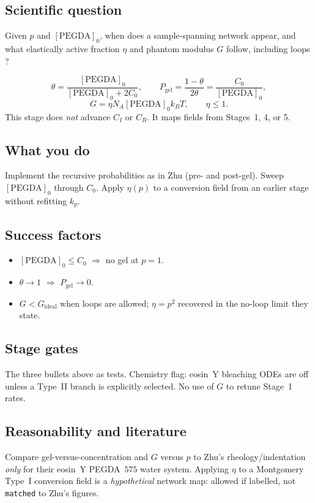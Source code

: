 \documentclass[11pt,a4paper]{article}
\newcommand{\tagmatch}{\texttt{matched}}
\begin{document}
\subsection{Scientific question}
Given $p$ and $[\mathrm{PEGDA}]_0$, when does a sample-spanning network appear, and what elastically active fraction $\eta$ and phantom modulus $G$ follow, including loops \citep{Zhu2020,Macosko1976,Miller1976}?

\begin{equation}
  \theta=\frac{[\mathrm{PEGDA}]_0}{[\mathrm{PEGDA}]_0+2C_0},\qquad
  P_{\mathrm{gel}}=\frac{1-\theta}{2\theta}=\frac{C_0}{[\mathrm{PEGDA}]_0},
\end{equation}
\begin{equation}
  G=\eta N_A [\mathrm{PEGDA}]_0 k_B T,\qquad \eta\le 1.
\end{equation}
This stage does \emph{not} advance $C_I$ or $C_R$.
It maps fields from Stages~1, 4, or 5.

\subsection{What you do}
Implement the recursive probabilities as in Zhu (pre- and post-gel).
Sweep $[\mathrm{PEGDA}]_0$ through $C_0$.
Apply $\eta(p)$ to a conversion field from an earlier stage without refitting $k_p$.

\subsection{Success factors}
\begin{itemize}
  \item $[\mathrm{PEGDA}]_0\le C_0$ $\Rightarrow$ no gel at $p=1$.
  \item $\theta\to 1$ $\Rightarrow$ $P_{\mathrm{gel}}\to 0$.
  \item $G < G_{\mathrm{ideal}}$ when loops are allowed; $\eta=p^2$ recovered in the no-loop limit they state.
\end{itemize}

\subsection{Stage gates}
The three bullets above as tests.
Chemistry flag: eosin~Y bleaching ODEs are off unless a Type~II branch is explicitly selected.
No use of $G$ to retune Stage~1 rates.

\subsection{Reasonability and literature}
Compare gel-versus-concentration and $G$ versus $p$ to Zhu's rheology/indentation \emph{only} for their eosin~Y PEGDA~$575$ water system.
Applying $\eta$ to a Montgomery Type~I conversion field is a \emph{hypothetical} network map: allowed if labelled, not \tagmatch{} to Zhu's figures.
\end{document}
